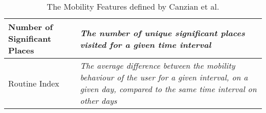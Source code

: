 \begin{table}[h]
\begin{tabular}{|p{}|p{}|}
Number of Significant Places & \textit{The number of unique significant places visited for a given time interval}                                                                                \\ \hline
Routine Index                & \textit{The average difference between the mobility behaviour of the user for a given interval, on a given day, compared to the same time interval on other days} \\ \hline
\end{tabular}
    \caption{The Mobility Features defined by Canzian et al. \cite{Canzian2015}}
    \label{tab:canzian-features}
\end{table}